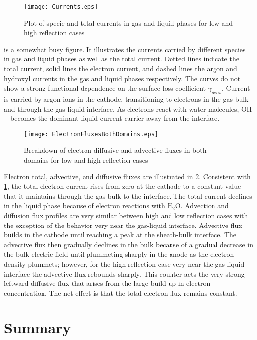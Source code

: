 \begin{figure}[htpb]
  \centering
  \texttt{[image: Currents.eps]}
  \caption{Plot of specie and total currents in gas and liquid phases for low and high reflection cases}
  \label{fig:currents}
\end{figure}

 is a somewhat busy figure. It illustrates the currents carried by different species in gas and liquid phases as well as the total current. Dotted lines indicate the total current, solid lines the electron current, and dashed lines the argon and hydroxyl currents in the gas and liquid phases respectively. The curves do not show a strong functional dependence on the surface loss coefficient $\gamma_{dens}$. Current is carried by argon ions in the cathode, transitioning to electrons in the gas bulk and through the gas-liquid interface. As electrons react with water molecules, OH$^-$ becomes the dominant liquid current carrier away from the interface.

\begin{figure}[htpb]
  \centering
  \texttt{[image: ElectronFluxesBothDomains.eps]}
  \caption{Breakdown of electron diffusive and advective fluxes in both domains for low and high reflection cases}
  \label{fig:electron_fluxes}
\end{figure}

Electron total, advective, and diffusive fluxes are illustrated in \cref{fig:electron_fluxes}. Consistent with \cref{fig:currents}, the total electron current rises from zero at the cathode to a constant value that it maintains through the gas bulk to the interface. The total current declines in the liquid phase because of electron reactions with H$_2$O. Advection and diffusion flux profiles are very similar between high and low reflection cases with the exception of the behavior very near the gas-liquid interface. Advective flux builds in the cathode until reaching a peak at the sheath-bulk interface. The advective flux then gradually declines in the bulk because of a gradual decrease in the bulk electric field until plummeting sharply in the anode as the electron density plummets; however, for the high reflection case very near the gas-liquid interface the advective flux rebounds sharply. This counter-acts the very strong leftward diffusive flux that arises from the large build-up in electron concentration. The net effect is that the total electron flux remains constant.

\section{Summary}

